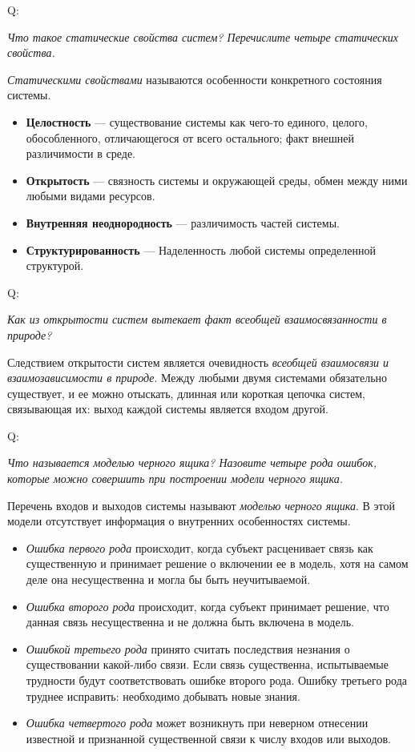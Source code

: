 \documentclass{article}
\newcommand{\note}[1]{\textit{#1}}
\newcommand{\define}[2]{
	\textbf{#1} --- #2
	}
\newcommand{\question}[2]{
	\begin{flushright}
		Q:\hspace{2ex}\vline\hspace{2ex}
		\begin{minipage}{0.9\textwidth}
			\large
			\textit{#1}
		\end{minipage}
	\end{flushright}
	\begin{center}
		\begin{minipage}{0.95\textwidth}
			#2
		\end{minipage}
	\end{center}
	}
\begin{document}
\question{Что такое статические свойства систем? Перечислите четыре статических свойства.}{\note{Статическими свойствами} называются особенности конкретного состояния системы.
	\begin{itemize}
		\item \define{Целостность}{существование системы как чего-то единого, целого, обособленного, отличающегося от всего остального; факт внешней различимости в среде.}
		\item \define{Открытость}{связность системы и окружающей среды, обмен между ними любыми видами ресурсов.}
		\item \define{Внутренняя неоднородность}{различимость частей системы.}
		\item \define{Структурированность}{Наделенность любой системы определенной структурой.}
	\end{itemize}}
\question{Как из открытости систем вытекает факт всеобщей взаимосвязанности в природе?}{Следствием открытости систем является очевидность \note{всеобщей взаимосвязи и взаимозависимости в природе}. Между любыми двумя системами обязательно существует, и ее можно отыскать, длинная или короткая цепочка систем, связывающая их: выход каждой системы является входом другой.}
\question{Что называется моделью черного ящика? Назовите четыре рода ошибок, которые можно совершить при построении модели черного ящика.}{Перечень входов и выходов системы называют \note{моделью черного ящика}. В этой модели отсутствует информация о внутренних особенностях системы.
	\begin{itemize}
		\item \note{Ошибка первого рода} происходит, когда субъект расценивает связь как существенную и принимает решение о включении ее в модель, хотя на самом деле она несущественна и могла бы быть неучитываемой.
		\item \note{Ошибка второго рода} происходит, когда субъект принимает решение, что данная связь несущественна и не должна быть включена в модель.
		\item \note{Ошибкой третьего рода} принято считать последствия незнания о существовании какой-либо связи. Если связь существенна, испытываемые трудности будут соответствовать ошибке второго рода. Ошибку третьего рода труднее исправить: необходимо добывать новые знания.
		\item \note{Ошибка четвертого рода} может возникнуть при неверном отнесении известной и признанной существенной связи к числу входов или выходов. 
	\end{itemize}}
\end{document}
